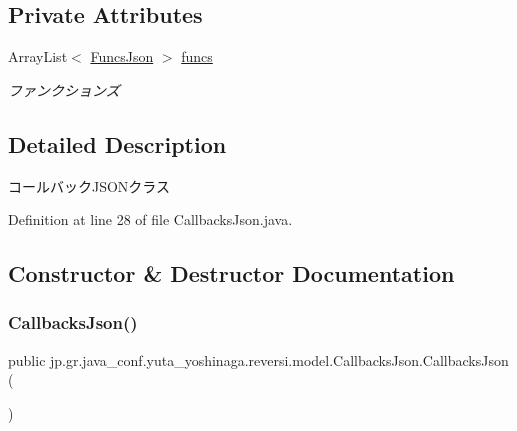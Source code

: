 \subsection*{Private Attributes}
\begin{DoxyCompactItemize}
\item 
\mbox{\label{classjp_1_1gr_1_1java__conf_1_1yuta__yoshinaga_1_1reversi_1_1model_1_1_callbacks_json_acbc23906e4e1cd6ff59a46ee2d7e1a85}} 
Array\+List$<$ \hyperlink{classjp_1_1gr_1_1java__conf_1_1yuta__yoshinaga_1_1reversi_1_1model_1_1_funcs_json}{Funcs\+Json} $>$ \hyperlink{classjp_1_1gr_1_1java__conf_1_1yuta__yoshinaga_1_1reversi_1_1model_1_1_callbacks_json_acbc23906e4e1cd6ff59a46ee2d7e1a85}{funcs}
\begin{DoxyCompactList}\small\item\em ファンクションズ \end{DoxyCompactList}\end{DoxyCompactItemize}


\subsection{Detailed Description}
コールバック\+J\+S\+O\+Nクラス 

Definition at line 28 of file Callbacks\+Json.\+java.



\subsection{Constructor \& Destructor Documentation}
\mbox{\label{classjp_1_1gr_1_1java__conf_1_1yuta__yoshinaga_1_1reversi_1_1model_1_1_callbacks_json_acdc36faba755660c46ab3d1641d18e67}} 
\subsubsection{\texorpdfstring{Callbacks\+Json()}{CallbacksJson()}}
{\footnotesize\ttfamily public jp.\+gr.\+java\+\_\+conf.\+yuta\+\_\+yoshinaga.\+reversi.\+model.\+Callbacks\+Json.\+Callbacks\+Json (\begin{DoxyParamCaption}{ }\end{DoxyParamCaption})}



